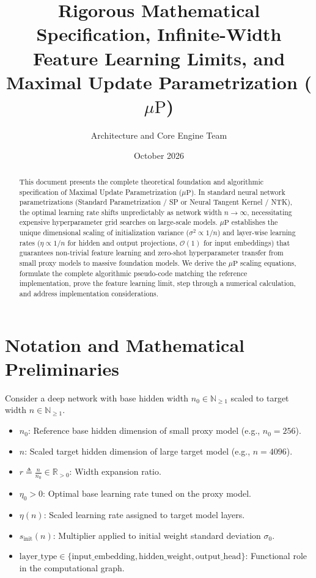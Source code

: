 \documentclass[11pt,a4paper]{article}
\title{\textbf{Rigorous Mathematical Specification, Infinite-Width Feature Learning Limits, and Maximal Update Parametrization ($\mu\text{P}$)}}
\author{Architecture and Core Engine Team}
\date{October 2026}
\theoremstyle{definition}
\begin{document}
\maketitle

\begin{abstract}
This document presents the complete theoretical foundation and algorithmic specification of Maximal Update Parametrization ($\mu\text{P}$). In standard neural network parametrizations (Standard Parametrization / SP or Neural Tangent Kernel / NTK), the optimal learning rate shifts unpredictably as network width $n \to \infty$, necessitating expensive hyperparameter grid searches on large-scale models. $\mu\text{P}$ establishes the unique dimensional scaling of initialization variance ($\sigma^2 \propto 1/n$) and layer-wise learning rates ($\eta \propto 1/n$ for hidden and output projections, $\mathcal{O}(1)$ for input embeddings) that guarantees non-trivial feature learning and zero-shot hyperparameter transfer from small proxy models to massive foundation models. We derive the $\mu\text{P}$ scaling equations, formulate the complete algorithmic pseudo-code matching the reference implementation, prove the feature learning limit, step through a numerical calculation, and address implementation considerations.
\end{abstract}

\section{Notation and Mathematical Preliminaries}

Consider a deep network with base hidden width $n_0 \in \mathbb{N}_{\ge 1}$ scaled to target width $n \in \mathbb{N}_{\ge 1}$.

\begin{itemize}
    \item $n_0$: Reference base hidden dimension of small proxy model (e.g., $n_0 = 256$).
    \item $n$: Scaled target hidden dimension of large target model (e.g., $n = 4096$).
    \item $r \triangleq \frac{n}{n_0} \in \mathbb{R}_{> 0}$: Width expansion ratio.
    \item $\eta_0 > 0$: Optimal base learning rate tuned on the proxy model.
    \item $\eta(n)$: Scaled learning rate assigned to target model layers.
    \item $s_{\text{init}}(n)$: Multiplier applied to initial weight standard deviation $\sigma_0$.
    \item $\text{layer\_type} \in \{\text{input\_embedding}, \text{hidden\_weight}, \text{output\_head}\}$: Functional role in the computational graph.
\end{itemize}
\end{document}
